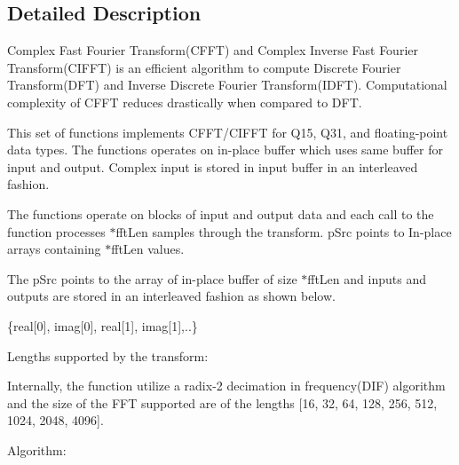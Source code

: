 \subsection{Detailed Description}
\begin{DoxyParagraph}{}
Complex Fast Fourier Transform(\-C\-F\-F\-T) and Complex Inverse Fast Fourier Transform(\-C\-I\-F\-F\-T) is an efficient algorithm to compute Discrete Fourier Transform(\-D\-F\-T) and Inverse Discrete Fourier Transform(\-I\-D\-F\-T). Computational complexity of C\-F\-F\-T reduces drastically when compared to D\-F\-T. 
\end{DoxyParagraph}
\begin{DoxyParagraph}{}
This set of functions implements C\-F\-F\-T/\-C\-I\-F\-F\-T for Q15, Q31, and floating-\/point data types. The functions operates on in-\/place buffer which uses same buffer for input and output. Complex input is stored in input buffer in an interleaved fashion.
\end{DoxyParagraph}
\begin{DoxyParagraph}{}
The functions operate on blocks of input and output data and each call to the function processes {$\ast$fft\-Len} samples through the transform. {\ttfamily p\-Src} points to In-\/place arrays containing {$\ast$fft\-Len} values. 
\end{DoxyParagraph}
\begin{DoxyParagraph}{}
The {\ttfamily p\-Src} points to the array of in-\/place buffer of size {$\ast$fft\-Len} and inputs and outputs are stored in an interleaved fashion as shown below. 
\begin{DoxyPre} \{real[0], imag[0], real[1], imag[1],..\} \end{DoxyPre}

\end{DoxyParagraph}
\begin{DoxyParagraph}{Lengths supported by the transform\-: }

\end{DoxyParagraph}
\begin{DoxyParagraph}{}
Internally, the function utilize a radix-\/2 decimation in frequency(\-D\-I\-F) algorithm and the size of the F\-F\-T supported are of the lengths \mbox{[}16, 32, 64, 128, 256, 512, 1024, 2048, 4096\mbox{]}.
\end{DoxyParagraph}
\begin{DoxyParagraph}{Algorithm\-: }

\end{DoxyParagraph}
